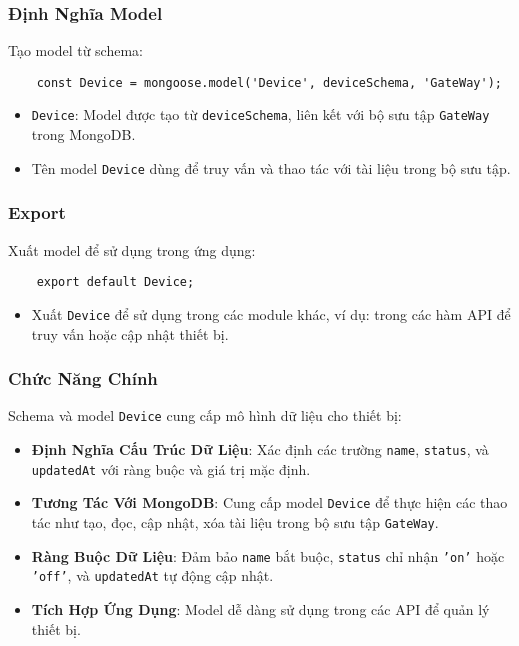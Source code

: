             \subsubsection{Định Nghĩa Model}
                \hspace*{0.6cm}Tạo model từ schema:
                \begin{lstlisting}
    const Device = mongoose.model('Device', deviceSchema, 'GateWay');
                \end{lstlisting}
                \begin{itemize}
                    \item \texttt{Device}: Model được tạo từ \texttt{deviceSchema}, liên kết với bộ sưu tập \texttt{GateWay} trong MongoDB.
                    \item Tên model \texttt{Device} dùng để truy vấn và thao tác với tài liệu trong bộ sưu tập.
                \end{itemize}

            \subsubsection{Export}
                \hspace*{0.6cm}Xuất model để sử dụng trong ứng dụng:
                \begin{lstlisting}
    export default Device;
                \end{lstlisting}
                \begin{itemize}
                    \item Xuất \texttt{Device} để sử dụng trong các module khác, ví dụ: trong các hàm API để truy vấn hoặc cập nhật thiết bị.
                \end{itemize}

            \subsubsection{Chức Năng Chính}
                \hspace*{0.6cm}Schema và model \texttt{Device} cung cấp mô hình dữ liệu cho thiết bị:
                \begin{itemize}
                    \item \textbf{Định Nghĩa Cấu Trúc Dữ Liệu}: Xác định các trường \texttt{name}, \texttt{status}, và \texttt{updatedAt} với ràng buộc và giá trị mặc định.
                    \item \textbf{Tương Tác Với MongoDB}: Cung cấp model \texttt{Device} để thực hiện các thao tác như tạo, đọc, cập nhật, xóa tài liệu trong bộ sưu tập \texttt{GateWay}.
                    \item \textbf{Ràng Buộc Dữ Liệu}: Đảm bảo \texttt{name} bắt buộc, \texttt{status} chỉ nhận \texttt{'on'} hoặc \texttt{'off'}, và \texttt{updatedAt} tự động cập nhật.
                    \item \textbf{Tích Hợp Ứng Dụng}: Model dễ dàng sử dụng trong các API để quản lý thiết bị.
                \end{itemize}
